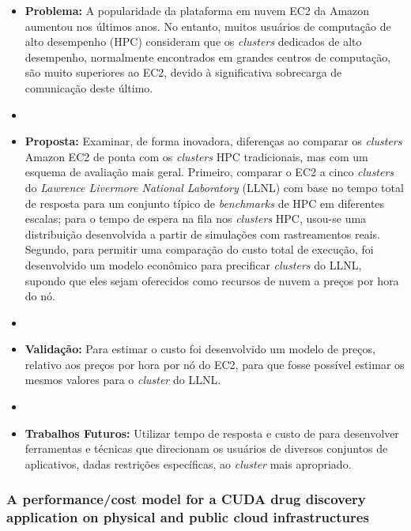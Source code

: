 \documentclass[tese,capa]{texufpel}
\begin{document}
\begin{itemize}[label={},noitemsep]
  \item \textbf{Problema:} A popularidade da plataforma em nuvem EC2 da Amazon aumentou nos últimos anos. No entanto, muitos usuários de computação de alto desempenho (HPC) consideram que os \textit{clusters} dedicados de alto desempenho, normalmente encontrados em grandes centros de computação, são muito superiores ao EC2, devido à significativa sobrecarga de comunicação deste último.
  \item 
  \item \textbf{Proposta:} Examinar, de forma inovadora, diferenças ao comparar os \textit{clusters} Amazon EC2 de ponta com os \textit{clusters} HPC tradicionais, mas com um esquema de avaliação mais geral. Primeiro, comparar o EC2 a cinco \textit{clusters} do \textit{Lawrence Livermore National Laboratory} (LLNL) com base no tempo total de resposta para um conjunto típico de \textit{benchmarks} de HPC em diferentes escalas; para o tempo de espera na fila nos \textit{clusters} HPC, usou-se uma distribuição desenvolvida a partir de simulações com rastreamentos reais. Segundo, para permitir uma comparação do custo total de execução, foi desenvolvido um modelo econômico para precificar \textit{clusters} do LLNL, supondo que eles sejam oferecidos como recursos de nuvem a preços por hora do nó.
  \item 
  \item \textbf{Validação:} Para estimar o custo foi desenvolvido um modelo de preços, relativo aos preços por hora por nó do EC2, para que fosse possível estimar os mesmos valores para o \textit{cluster} do LLNL.
  \item 
  \item \textbf{Trabalhos Futuros:} Utilizar tempo de resposta e custo de para desenvolver ferramentas e técnicas que direcionam os usuários de diversos conjuntos de aplicativos, dadas restrições específicas, ao \textit{cluster} mais apropriado.  
\end{itemize}


\subsubsection{A performance/cost model for a CUDA drug discovery application on physical and public cloud infrastructures \cite{guerreroPerformanceCostModel2014b}}
\end{document}
